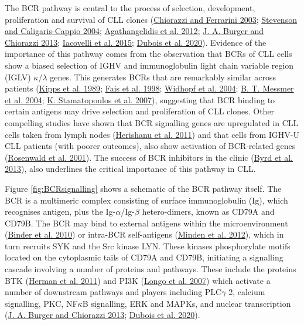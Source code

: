 \documentclass[11pt, a4paper, twosided]{book}
\begin{document}
The BCR pathway is central to the process of selection, development, proliferation and survival of CLL clones (\protect\hyperlink{ref-Chiorazzi2003}{Chiorazzi and Ferrarini 2003}; \protect\hyperlink{ref-Stevenson2004}{Stevenson and Caligaris-Cappio 2004}; \protect\hyperlink{ref-Agathangelidis2012}{Agathangelidis et al. 2012}; \protect\hyperlink{ref-Burger2013}{J. A. Burger and Chiorazzi 2013}; \protect\hyperlink{ref-Iacovelli2015}{Iacovelli et al. 2015}; \protect\hyperlink{ref-Dubois2020}{Dubois et al. 2020}). Evidence of the importance of this pathway comes from the observation that BCRs of CLL cells show a biased selection of IGHV and immunoglobulin light chain variable region (IGLV) \(\kappa\)/\(\lambda\) genes. This generates BCRs that are remarkably similar across patients (\protect\hyperlink{ref-Kipps1989}{Kipps et al. 1989}; \protect\hyperlink{ref-Fais1998}{Fais et al. 1998}; \protect\hyperlink{ref-Widhopf2004}{Widhopf et al. 2004}; \protect\hyperlink{ref-Messmer2004}{B. T. Messmer et al. 2004}; \protect\hyperlink{ref-Stamatopoulos2007}{K. Stamatopoulos et al. 2007}), suggesting that BCR binding to certain antigens may drive selection and proliferation of CLL clones. Other compelling studies have shown that BCR signalling genes are upregulated in CLL cells taken from lymph nodes (\protect\hyperlink{ref-Herishanu2011}{Herishanu et al. 2011}) and that cells from IGHV-U CLL patients (with poorer outcomes), also show activation of BCR-related genes (\protect\hyperlink{ref-Rosenwald2001}{Rosenwald et al. 2001}). The success of BCR inhibitors in the clinic (\protect\hyperlink{ref-Byrd2013}{Byrd et al. 2013}), also underlines the critical importance of this pathway in CLL.

Figure \ref{fig:BCRsignalling} shows a schematic of the BCR pathway itself. The BCR is a multimeric complex consisting of surface immunoglobulin (Ig), which recognises antigen, plus the Ig-\(\alpha\)/Ig-\(\beta\) hetero-dimers, known as CD79A and CD79B. The BCR may bind to external antigens within the microenvironment (\protect\hyperlink{ref-Binder2010}{Binder et al. 2010}) or intra-BCR self-antigens (\protect\hyperlink{ref-Minden2012}{Minden et al. 2012}), which in turn recruits SYK and the Src kinase LYN. These kinases phosphorylate motifs located on the cytoplasmic tails of CD79A and CD79B, initiating a signalling cascade involving a number of proteins and pathways. These include the proteins BTK (\protect\hyperlink{ref-Herman2011}{Herman et al. 2011}) and PI3K (\protect\hyperlink{ref-Longo2007}{Longo et al. 2007}) which activate a number of downstream pathways and players including PLC\(\gamma\) 2, calcium signalling, PKC, NF\(\kappa\)B signalling, ERK and MAPKs, and nuclear transcription (\protect\hyperlink{ref-Burger2013}{J. A. Burger and Chiorazzi 2013}; \protect\hyperlink{ref-Dubois2020}{Dubois et al. 2020}).
\end{document}
